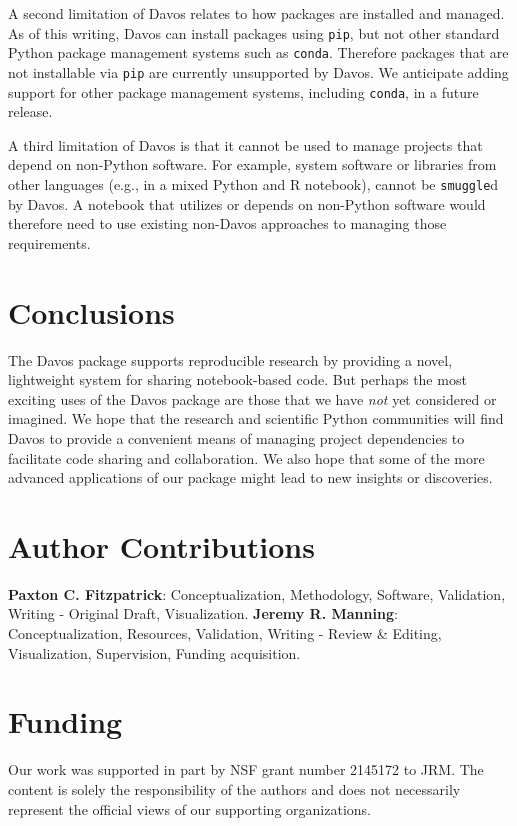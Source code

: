 \documentclass[preprint,12pt,a4paper]{elsarticle}
\begin{document}
A second limitation of Davos relates to how packages are installed and managed.
As of this writing, Davos can install packages using \texttt{pip}, but not
other standard Python package management systems such as \texttt{conda}.
Therefore packages that are not installable via \texttt{pip} are currently
unsupported by Davos. We anticipate adding support for other package management
systems, including \texttt{conda}, in a future release.

A third limitation of Davos is that it cannot be used to manage projects that
depend on non-Python software. For example, system software or libraries from
other languages (e.g., in a mixed Python and R notebook), cannot be
\texttt{smuggle}d by Davos. A notebook that utilizes or depends on non-Python
software would therefore need to use existing non-Davos approaches to managing
those requirements.

\section{Conclusions}

The Davos package supports reproducible research by providing
a novel, lightweight system for sharing notebook-based code. But
perhaps the most exciting uses of the Davos package are those
that we have \textit{not} yet considered or imagined. We hope that the
research and scientific Python communities will find Davos to provide a convenient
means of managing project dependencies to facilitate code sharing and collaboration. We
also hope that some of the more advanced applications of our package
might lead to new insights or discoveries.


\section*{Author Contributions}

\textbf{Paxton C. Fitzpatrick}: Conceptualization, Methodology,
Software, Validation, Writing - Original Draft,
Visualization. \textbf{Jeremy R. Manning}: Conceptualization,
Resources, Validation, Writing - Review \& Editing, Visualization, Supervision,
Funding acquisition.

\section*{Funding}

Our work was supported in part by NSF grant number 2145172 to JRM.
The content is solely the responsibility of the authors and does not
necessarily represent the official views of our supporting
organizations.
\end{document}
